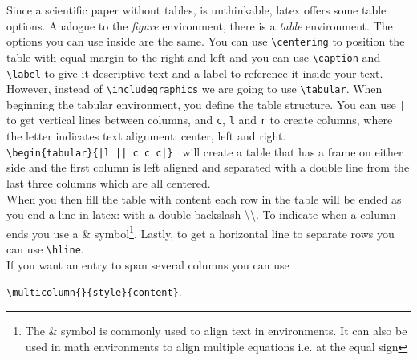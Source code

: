 Since a scientific paper without tables, is unthinkable, latex offers some table options. Analogue to the \textit{figure} environment, there is a \textit{table} environment. The options you can use inside are the same. You can use \texttt{\textbackslash centering} to position the table with equal margin to the right and left and you can use \texttt{\textbackslash caption} and \texttt{\textbackslash label} to give it descriptive text and a label to reference it inside your text.\\
However, instead of \texttt{\textbackslash includegraphics} we are going to use \texttt{\textbackslash tabular}. When beginning the tabular environment, you define the table structure. You can use \texttt{|} to get vertical lines between columns, and \texttt{c}, \texttt{l} and \texttt{r} to create columns, where the letter indicates text alignment: center, left and right.\\
\texttt{\textbackslash begin\{tabular\}\{|l || c c c|\} } will create a table that has a frame on either side and the first column is left aligned and separated with a double line from the last three columns which are all centered.\\
When you then fill the table with content each row in the table will be ended as you end a line in latex: with a double backslash \textbackslash\textbackslash. To indicate when a column ends you use a \& symbol\footnote{The \& symbol is commonly used to align text in environments. It can also be used in math environments to align multiple equations i.e. at the equal sign}. Lastly, to get a horizontal line to separate rows you can use \texttt{\textbackslash hline}.\\
If you want an entry to span several columns you can use

\texttt{\textbackslash multicolumn\{<no of columns>\}\{style\}\{content\}}.

